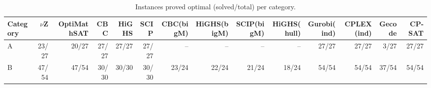 \begin{table}[t]
\centering
\caption{Instances proved optimal (solved/total) per category.}
\label{tab:exp-solved}
\small
\begin{tabular}{@{}lrrrrrrrrrrrrr@{}}
\toprule
Category & $\nu$Z & OptiMathSAT & CBC & HiGHS & SCIP & CBC(bigM) & HiGHS(bigM) & SCIP(bigM) & HiGHS(hull) & Gurobi(ind) & CPLEX(ind) & Gecode & CP-SAT \\
\midrule
A & 23/27 & 20/27 & 27/27 & 27/27 & 27/27 & -- & -- & -- & -- & 27/27 & 27/27 & 3/27 & 27/27 \\
B & 47/54 & 47/54 & 30/30 & 30/30 & 30/30 & 23/24 & 22/24 & 21/24 & 18/24 & 54/54 & 54/54 & 37/54 & 54/54 \\
\bottomrule
\end{tabular}
\end{table}
